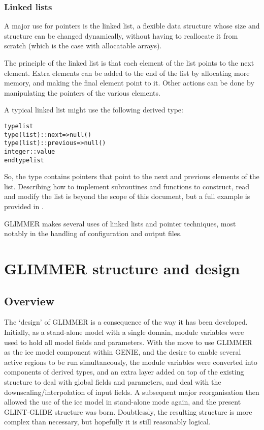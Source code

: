 \subsubsection{Linked lists}
%
A major use for pointers is the linked list, a flexible data structure whose
size and structure can be changed dynamically, without having to reallocate it
from scratch (which is the case with allocatable arrays).

The principle of the linked list is that each element of the list points to
the next element. Extra elements can be added to the end of the list by
allocating more memory, and making the final element point to it. Other
actions can be done by manipulating the pointers of the various elements.

A typical linked list might use the following derived type:
%
\begin{alltt}
    type list
        type(list) :: next => null()
        type(list) :: previous => null()
        integer :: value
    end type list
\end{alltt}
%
So, the type contains pointers that point to the next and previous elements
of the list. Describing how to implement subroutines and functions to
construct, read and modify the list is beyond the scope of this document, but
a full example is provided in \cite{Metcalf1999}.

GLIMMER makes several uses of linked lists and pointer techniques, most
notably in the handling of configuration and output files.
%
\section{GLIMMER structure and design}
%
\subsection{Overview}
%
The `design' of GLIMMER is a consequence of the way it has been
developed. Initially, as a stand-alone model with a single domain, module
variables were used to hold all model fields and parameters. With the move to
use GLIMMER as the ice model component within GENIE, and the desire to enable
several active regions to be run simultaneously, the module variables were
converted into components of derived types, and an extra layer added on top of
the existing structure to deal with global fields and parameters, and deal
with the downscaling/interpolation of input fields. A subsequent major
reorganisation then allowed the use of the ice model in stand-alone mode
again, and the present GLINT-GLIDE structure was born. Doubtlessly, the
resulting structure is more complex than necessary, but hopefully it is still
reasonably logical.


